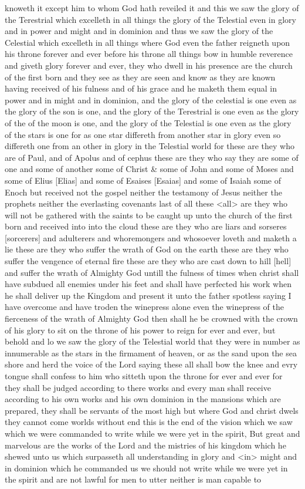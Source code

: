 knoweth it except him to whom God hath reveiled it and this we saw the glory of the Terestrial which excelleth in all things the glory of the Telestial even in glory and in power and might and in dominion and thus we saw the glory of the Celestial which excelleth in all things where God even the father reigneth upon his throne forever and ever before his throne all things bow in humble reverence and giveth glory forever and ever, they who dwell in his presence are the church of the first born and they see as they are seen and know as they are known having received of his fulness and of his grace and he maketh them equal in power and in might and in dominion, and the glory of the celestial is one even as the glory of the son is one, and the glory of the Terestrial is one even as the glory of the of the moon is one, and the glory of the Telestial is one even as the glory of the stars is one for as one star differeth from another star in glory even so differeth one from an other in glory in the Telestial world for these are they who are of Paul, and of Apolus and of cephus these are they who say they are some of one and some of another some of Christ \& some of John and some of Moses and some of Elius [Elias] and some of Esaises [Esaias] and some of Isaiah some of Enoch but received not the gospel neither the testamony of Jesus neither the prophets neither the everlasting covenants last of all these <all> are they who will not be gathered with the saints to be caught up unto the church of the first born and received into into the cloud these are they who are liars and sorseres [sorcerers] and adulterers and whoremongers and whosoever loveth and maketh a lie these are they who suffer the wrath of God on the earth these are they who suffer the vengence of eternal fire these are they who are cast down to hill [hell] and suffer the wrath of Almighty God untill the fulness of times when christ shall have subdued all enemies under his feet and shall have perfected his work when he shall deliver up the Kingdom and present it unto the father spotless saying I have overcome and have troden the winepress alone even the winepress of the fierceness of the wrath of Almighty God then shall he be crowned with the crown of his glory to sit on the throne of his power to reign for ever and ever, but behold and lo we saw the glory of the Telestial world that they were in number as innumerable as the stars in the firmament of heaven, or as the sand upon the sea shore and herd the voice of the Lord saying these all shall bow the knee and evry tongue shall confess to him who sitteth upon the throne for ever and ever for they shall be judged according to there works and every man shall receive according to his own works and his own dominion in the mansions which are prepared, they shall be servants of the most high but where God and christ dwels they cannot come worlds without end this is the end of the vision which we saw which we were commanded to write while we were yet in the spirit, But great and marvelous are the works of the Lord and the mistries of his kingdom which he shewed unto us which surpasseth all understanding in glory and <in> might and in dominion which he commanded us we should not write while we were yet in the spirit and are not lawful for men to utter neither is man capable to 